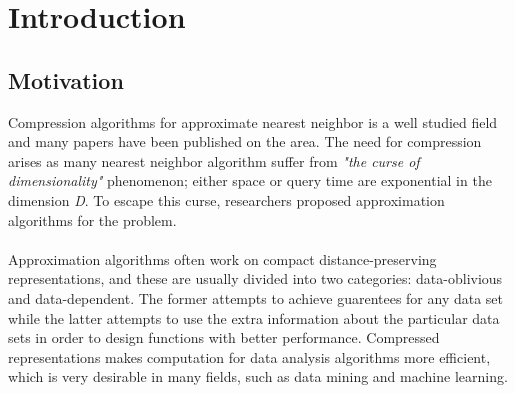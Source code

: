\section{Introduction}
\label{introduction}
\subsection{Motivation} %
Compression algorithms for approximate nearest neighbor is a well studied field and many papers have been published on the area. The need for compression arises as many nearest neighbor algorithm suffer from \textit{"the curse of dimensionality"} phenomenon; either space or query time are exponential in the dimension \textit{D}. To escape this curse,
researchers proposed approximation algorithms for the problem.\cite{ilya15} 
\\
\\
Approximation algorithms often work on compact distance-preserving representations, and these are usually divided into two categories: data-oblivious and data-dependent. The former attempts to achieve guarentees for any data set while the latter attempts to use the extra information about the particular data sets in order to design functions with better performance. Compressed representations makes computation for data analysis algorithms more efficient, which is very desirable in many fields, such as data mining and machine learning.\cite{stan15}
